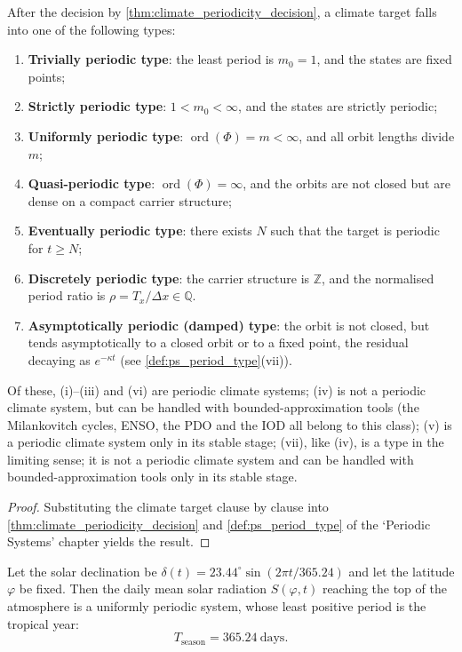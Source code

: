 \begin{corollary}\label{cor:climate_period_type}
After the decision by \cref{thm:climate_periodicity_decision}, a climate target falls into one of the following types:
\begin{enumerate}[label=(\roman*)]
    \item \textbf{Trivially periodic type}: the least period is $m_0=1$, and the states are fixed points;
    \item \textbf{Strictly periodic type}: $1<m_0<\infty$, and the states are strictly periodic;
    \item \textbf{Uniformly periodic type}: $\operatorname{ord}(\Phi)=m<\infty$, and all orbit lengths divide $m$;
    \item \textbf{Quasi-periodic type}: $\operatorname{ord}(\Phi)=\infty$, and the orbits are not closed but are dense on a compact carrier structure;
    \item \textbf{Eventually periodic type}: there exists $N$ such that the target is periodic for $t\ge N$;
    \item \textbf{Discretely periodic type}: the carrier structure is $\mathbb Z$, and the normalised period ratio is $\rho=T_x/\Delta x\in\mathbb Q$.
    \item \textbf{Asymptotically periodic (damped) type}: the orbit is not closed, but tends asymptotically to a closed orbit or to a fixed point, the residual decaying as $e^{-\kappa t}$ (see \cref{def:ps_period_type}(vii)).
\end{enumerate}
Of these, (i)--(iii) and (vi) are periodic climate systems; (iv) is not a periodic climate system, but can be handled with bounded-approximation tools (the Milankovitch cycles, ENSO, the PDO and the IOD all belong to this class); (v) is a periodic climate system only in its stable stage; (vii), like (iv), is a type in the limiting sense; it is not a periodic climate system and can be handled with bounded-approximation tools only in its stable stage.
\end{corollary}

\begin{proof}
Substituting the climate target clause by clause into \cref{thm:climate_periodicity_decision} and \cref{def:ps_period_type} of the `Periodic Systems' chapter yields the result.
\end{proof}

\begin{lemma}\label{lem:seasonal_periodic}
Let the solar declination be $\delta(t) = 23.44^\circ \sin(2\pi t/365.24)$ and let the latitude $\varphi$ be fixed. Then the daily mean solar radiation $S(\varphi,t)$ reaching the top of the atmosphere is a uniformly periodic system, whose least positive period is the tropical year:
\[
T_{\text{season}}=365.24\ \text{days}.
\]
\end{lemma}

